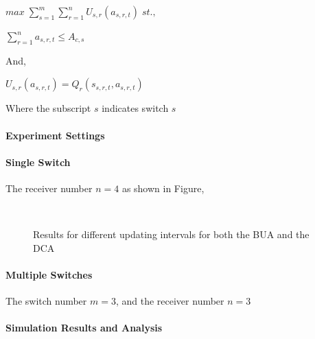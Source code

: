   $max \; \sum_{s = 1}^{m}\sum_{r = 1}^{n} U_{s,r}(a_{s,r,t})\;st.,$
  
  $\sum_{r = 1}^{n}a_{s,r,t} \leq A_{c,s}$
  
  And,  
  
  $U_{s,r}(a_{s,r,t}) = Q_r(s_{s,r,t}, a_{s,r,t})$
  
  Where the subscript $s$ indicates switch $s$
  
  
  
\paragraph{Experiment Settings}
 
\paragraph{Single Switch}
The receiver number $n = 4$ as shown in Figure{}, 

\begin{figure}[t!]
  \begin{center}
     \\
  \end{center}
  \caption{Results for different updating intervals for both the BUA and the DCA}
  \label{fig:aggrinterval}
\end{figure}


\paragraph{Multiple Switches}
The switch number $m = 3$, and the receiver number $n = 3$
  
\paragraph{Simulation Results and Analysis} 
  

% 
